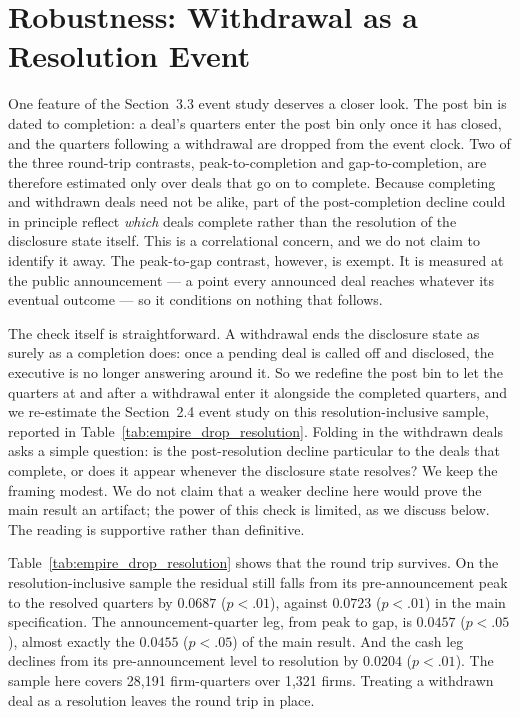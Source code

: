 \section{Robustness: Withdrawal as a Resolution Event}

One feature of the Section~3.3 event study deserves a closer look. The post bin is dated to completion: a deal's quarters enter the post bin only once it has closed, and the quarters following a withdrawal are dropped from the event clock. Two of the three round-trip contrasts, peak-to-completion and gap-to-completion, are therefore estimated only over deals that go on to complete. Because completing and withdrawn deals need not be alike, part of the post-completion decline could in principle reflect \emph{which} deals complete rather than the resolution of the disclosure state itself. This is a correlational concern, and we do not claim to identify it away. The peak-to-gap contrast, however, is exempt. It is measured at the public announcement --- a point every announced deal reaches whatever its eventual outcome --- so it conditions on nothing that follows.

The check itself is straightforward. A withdrawal ends the disclosure state as surely as a completion does: once a pending deal is called off and disclosed, the executive is no longer answering around it. So we redefine the post bin to let the quarters at and after a withdrawal enter it alongside the completed quarters, and we re-estimate the Section~2.4 event study on this resolution-inclusive sample, reported in Table~\ref{tab:empire_drop_resolution}. Folding in the withdrawn deals asks a simple question: is the post-resolution decline particular to the deals that complete, or does it appear whenever the disclosure state resolves? We keep the framing modest. We do not claim that a weaker decline here would prove the main result an artifact; the power of this check is limited, as we discuss below. The reading is supportive rather than definitive.

Table~\ref{tab:empire_drop_resolution} shows that the round trip survives. On the resolution-inclusive sample the residual still falls from its pre-announcement peak to the resolved quarters by $0.0687$ ($p<.01$), against $0.0723$ ($p<.01$) in the main specification. The announcement-quarter leg, from peak to gap, is $0.0457$ ($p<.05$), almost exactly the $0.0455$ ($p<.05$) of the main result. And the cash leg declines from its pre-announcement level to resolution by $0.0204$ ($p<.01$). The sample here covers 28,191 firm-quarters over 1,321 firms. Treating a withdrawn deal as a resolution leaves the round trip in place.

